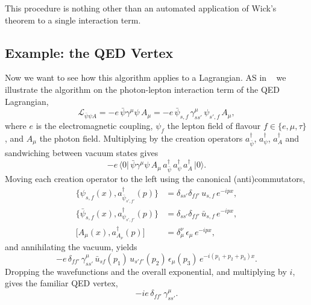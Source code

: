 This procedure is nothing other than an automated application of
Wick's theorem to a single interaction term.

\subsection{Example: the QED Vertex}

Now we want to see how this algorithm applies to a Lagrangian. AS in ~\cite{Christensen:2008py} we illustrate the algorithm on the photon-lepton interaction term of
the QED Lagrangian,
\begin{equation}
    \mathcal L_{\bar\psi\psi A}
    = -e\, \bar\psi \gamma^\mu \psi\, A_\mu
    = -e\, \bar\psi_{s,f}\, \gamma^\mu_{ss'}\, \psi_{s',f}\, A_\mu,
\end{equation}
where $e$ is the electromagnetic coupling, $\psi_f$ the lepton field
of flavour $f \in \{e,\mu,\tau\}$, and $A_\mu$ the photon field.
Multiplying by the creation operators $a^\dagger_{\bar\psi}$,
$a^\dagger_\psi$, $a^\dagger_A$ and sandwiching between vacuum states gives
\begin{equation}
    -e\, \big\langle 0 \big|\,
    \bar\psi \gamma^\mu \psi\, A_\mu\,
    a^\dagger_{\bar\psi}\, a^\dagger_\psi\, a^\dagger_A
    \,\big| 0 \big\rangle.
\end{equation}
Moving each creation operator to the left using the canonical
(anti)commutators,
\begin{align}
    \big\{ \psi_{s,f}(x), a^\dagger_{\bar\psi_{s',f'}}(p) \big\}
        &= \delta_{ss'}\delta_{ff'}\, u_{s,f}\, e^{-ipx}, \\
    \big\{ \bar\psi_{s,f}(x), a^\dagger_{\psi_{s',f'}}(p) \big\}
        &= \delta_{ss'}\delta_{ff'}\, \bar u_{s,f}\, e^{-ipx}, \\
    \big[ A_\mu(x), a^\dagger_{A_\nu}(p) \big]
        &= \delta_\mu^\nu\, \epsilon_\mu\, e^{-ipx},
\end{align}
and annihilating the vacuum, yields
\begin{equation}
    -e\, \delta_{ff'}\, \gamma^\mu_{ss'}\,
    \bar u_{sf}(p_1)\, u_{s'f'}(p_2)\, \epsilon_\mu(p_3)\,
    e^{-i(p_1+p_2+p_3)x}.
\end{equation}
Dropping the wavefunctions and the overall exponential, and
multiplying by $i$, gives the familiar QED vertex,
\begin{equation}
    -ie\, \delta_{ff'}\, \gamma^\mu_{ss'}.
\end{equation}

